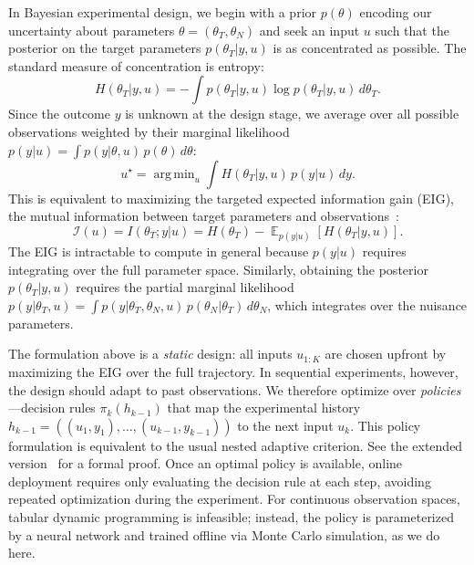 \documentclass[conference]{IEEEtran}
\newif\ifextended
\DeclareMathOperator*{\argmin}{arg\,min}
\DeclareMathOperator{\E}{\mathbb{E}}
\begin{document}
In Bayesian experimental design, we begin with a prior $p(\theta)$ encoding our uncertainty about parameters $\theta = (\theta_T, \theta_N)$ and seek an input $u$ such that the posterior on the target parameters $p(\theta_T|y,u)$ is as concentrated as possible. The standard measure of concentration is entropy:
\begin{equation}
H(\theta_T|y,u) = -\int p(\theta_T|y,u) \log p(\theta_T|y,u)\,d\theta_T.
\end{equation}
Since the outcome $y$ is unknown at the design stage, we average over all possible observations weighted by their marginal likelihood $p(y|u) = \int p(y|\theta,u)\,p(\theta)\,d\theta$:
\begin{equation}\label{eq:bed_entropy}
u^\star = \argmin_{u} \int H(\theta_T|y,u)\,p(y|u)\,dy.
\end{equation}
This is equivalent to maximizing the targeted expected information gain (EIG), the mutual information between target parameters and observations~\cite{lindley1956}:
\begin{equation}\label{eq:eig}
\mathcal{I}(u) = I(\theta_T; y|u) = H(\theta_T) - \E_{p(y|u)}[H(\theta_T|y,u)].
\end{equation}
The EIG is intractable to compute in general because $p(y|u)$ requires integrating over the full parameter space. Similarly, obtaining the posterior $p(\theta_T|y,u)$ requires the partial marginal likelihood $p(y|\theta_T,u) = \int p(y|\theta_T, \theta_N, u)\,p(\theta_N|\theta_T)\,d\theta_N$, which integrates over the nuisance parameters.

The formulation above is a \emph{static} design: all inputs $u_{1:K}$ are chosen upfront by maximizing the EIG over the full trajectory.
In sequential experiments, however, the design should adapt to past observations.
We therefore optimize over \emph{policies}---decision rules $\pi_k(h_{k-1})$ that map the experimental history $h_{k-1} = ((u_1, y_1), \ldots, (u_{k-1}, y_{k-1}))$ to the next input $u_k$.
This policy formulation is equivalent to the usual nested adaptive criterion.\ifextended{} See Appendix~\ref{sec:policy_equiv} for a formal proof. \else{} See the extended version~\cite{strouwen2026extended} for a formal proof. \fi
Once an optimal policy is available, online deployment requires only evaluating the decision rule at each step, avoiding repeated optimization during the experiment. For continuous observation spaces, tabular dynamic programming is infeasible; instead, the policy is parameterized by a neural network and trained offline via Monte Carlo simulation, as we do here.
\end{document}
